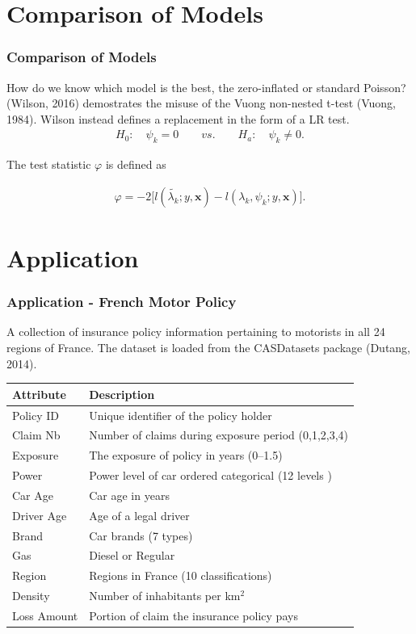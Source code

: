 \documentclass{beamer}
\begin{document}
\section{Comparison of Models}
\begin{frame}
\frametitle{Comparison of Models}
How do we know which model is the best, the zero-inflated or standard Poisson? (Wilson, 2016) demostrates the misuse of the Vuong non-nested t-test (Vuong, 1984). Wilson instead defines a replacement in the form of a LR test. 
\begin{align*}
& & H_0: \quad \psi_k = 0 \quad\quad vs. \quad\quad H_a: \quad \psi_k \neq 0 . & &
\end{align*}
\begin{center}The test statistic $\varphi$ is defined as \end{center}
\begin{align}
\varphi = -2 \bigg[l(\tilde{\lambda_k}; y, \bm{x}) - l(\lambda_k, \psi_k; y , \bm{x} )\bigg].
\end{align}
\end{frame}

\section{Application}
\begin{frame}
\frametitle{Application - French Motor Policy}
A collection of insurance policy information pertaining to motorists in all 24 regions of France. The dataset is loaded from the CASDatasets package (Dutang, 2014). 
\begin{small}
\begin{table}[!htb]
\begin{center}
      \centering
        \begin{tabular}{ll}
\hline
Attribute & Description \\
\hline
Policy ID & Unique identifier of the policy holder\\
Claim Nb & Number of claims during exposure period  (0,1,2,3,4)\\
Exposure & The exposure of policy in years (0--1.5) \\
Power & Power level of car ordered categorical (12 levels )\\
Car Age & Car age in years \\
Driver Age & Age of a legal driver \\
Brand & Car brands (7 types) \\
Gas & Diesel or Regular \\
Region & Regions in France (10 classifications)\\
Density & Number of inhabitants per km$^2$ \\
Loss Amount & Portion of claim the insurance policy pays\\
\hline
		\end{tabular}
\end{center}
\end{table}
\end{small}
\end{frame}
\end{document}
